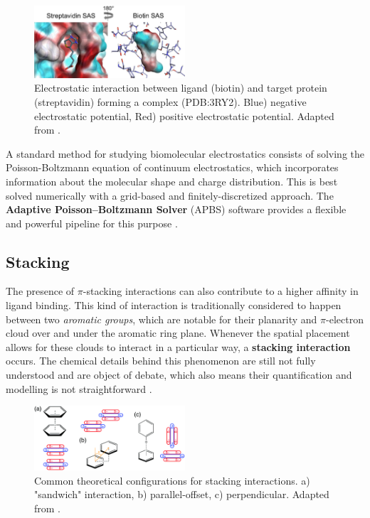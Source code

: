     \begin{figure}[H]
      \centering
      \includegraphics[width=0.5\textwidth]{figures/intro/electrostatics.png}
      \caption{\label{fig:intro/electrostatics} Electrostatic interaction between ligand (biotin) and target protein (streptavidin) forming a complex (PDB:3RY2). Blue) negative electrostatic potential, Red) positive electrostatic potential. Adapted from \cite{electrostatics_2019}.}
    \end{figure}

    A standard method for studying biomolecular electrostatics consists of solving the Poisson-Boltzmann equation of continuum electrostatics, which incorporates information about the molecular shape and charge distribution. This is best solved numerically with a grid-based and finitely-discretized approach. The \textbf{Adaptive Poisson–Boltzmann Solver} (APBS) software provides a flexible and powerful pipeline for this purpose \cite{apbs_2004, apbs_2018, apbs_web, umol_apbs_2020}.

  \subsection{Stacking}
    The presence of $\pi$-stacking interactions can also contribute to a higher affinity in ligand binding. This kind of interaction is traditionally considered to happen between two \textit{aromatic groups}, which are notable for their planarity and $\pi$-electron cloud over and under the aromatic ring plane. Whenever the spatial placement allows for these clouds to interact in a particular way, a \textbf{stacking interaction} occurs. The chemical details behind this phenomenon are still not fully understood and are object of debate, which also means their quantification and modelling is not straightforward \cite{stacking_binding_2020, stacking_trp_2022, stacking_general_2020}.

    \begin{figure}[H]
      \centering
      \includegraphics[width=0.5\textwidth]{figures/intro/stacking_configs.png}
      \caption{\label{fig:intro/stacking_configs} Common theoretical configurations for stacking interactions. a) "sandwich" interaction, b) parallel-offset, c) perpendicular. Adapted from \cite{stacking_general_2020}.}
    \end{figure}

